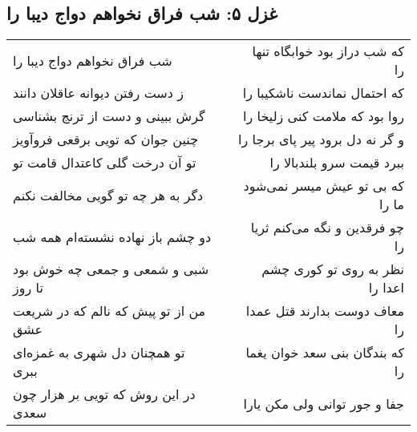 \begin{center}
\section*{غزل ۵: شب فراق نخواهم دواج دیبا را}
\label{sec:005}
\begin{longtable}{l p{0.5cm} r}
شب فراق نخواهم دواج دیبا را
&&
که شب دراز بود خوابگاه تنها را
\\
ز دست رفتن دیوانه عاقلان دانند
&&
که احتمال نماندست ناشکیبا را
\\
گرش ببینی و دست از ترنج بشناسی
&&
روا بود که ملامت کنی زلیخا را
\\
چنین جوان که تویی برقعی فروآویز
&&
و گر نه دل برود پیر پای برجا را
\\
تو آن درخت گلی کاعتدال قامت تو
&&
ببرد قیمت سرو بلندبالا را
\\
دگر به هر چه تو گویی مخالفت نکنم
&&
که بی تو عیش میسر نمی‌شود ما را
\\
دو چشم باز نهاده نشسته‌ام همه شب
&&
چو فرقدین و نگه می‌کنم ثریا را
\\
شبی و شمعی و جمعی چه خوش بود تا روز
&&
نظر به روی تو کوری چشم اعدا را
\\
من از تو پیش که نالم که در شریعت عشق
&&
معاف دوست بدارند قتل عمدا را
\\
تو همچنان دل شهری به غمزه‌ای ببری
&&
که بندگان بنی سعد خوان یغما را
\\
در این روش که تویی بر هزار چون سعدی
&&
جفا و جور توانی ولی مکن یارا
\\
\end{longtable}
\end{center}

